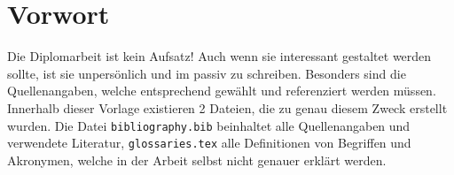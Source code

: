 \chapter{Vorwort}
Die Diplomarbeit ist kein Aufsatz!
Auch wenn sie interessant gestaltet werden sollte, ist sie unpersönlich und im passiv zu schreiben.
Besonders sind die Quellenangaben, welche entsprechend gewählt und referenziert werden müssen.
Innerhalb dieser Vorlage existieren 2 Dateien, die zu genau diesem Zweck erstellt wurden. Die Datei \verb|bibliography.bib| beinhaltet alle Quellenangaben und verwendete Literatur, \verb|glossaries.tex| alle Definitionen von Begriffen und Akronymen, welche in der Arbeit selbst nicht genauer erklärt werden.
